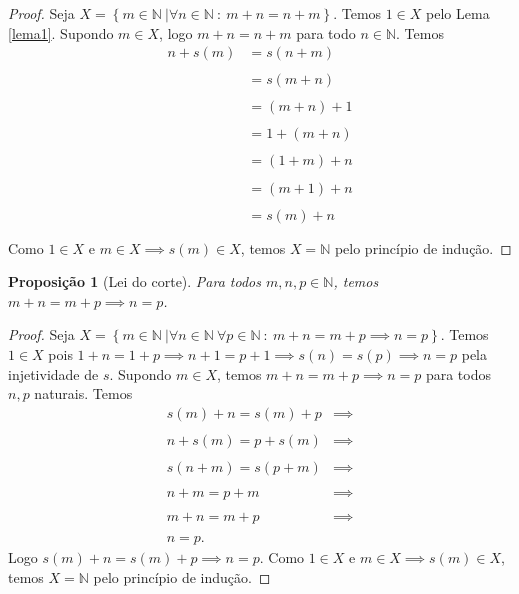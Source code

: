 \documentclass{article}
\theoremstyle{plain}
\newtheorem{prop}{Proposição}[section]
\theoremstyle{definition}
\theoremstyle{remark}
\begin{document}
\begin{proof}
	Seja $X = \left\{ m \in \mathbb{N} \: | \forall n \in \mathbb{N} \: : \:  m+n = n+m \right\}$. Temos $1\in X$  pelo  Lema \ref{lema1}.
	Supondo $m\in X$, logo $m+n = n+m$ para todo $n\in \mathbb{N}$. Temos \begin{align*}
		n + s(m) &= s(n+m)  \\~\\
		&= s(m+n) \\~\\
		&= (m+n) + 1\\~\\
		&= 1+(m +n )\\~\\
		&= (1+m )+n \\~\\
		&= (m+1 )+n \\~\\
		&= s(m) +n \\~\\
	\end{align*}
	Como $1\in X$ e $m \in X \implies s(m) \in X$, temos $X = \mathbb{N}$ pelo princípio de indução.
\end{proof}
\begin{prop}[Lei do corte]
	Para todos $m,n, p  \in \mathbb{N}$, temos $m+n = m +p \implies n = p $.
\end{prop}
\begin{proof}
	Seja $X = \left\{ m \in \mathbb{N} \: | \forall n\in \mathbb{N}\: \forall p \in \mathbb{N} \: : \:  m+n = m+p\implies n=p \right\}$. Temos $1\in X$  pois $1+n = 1+p \implies n+1 = p+1 \implies s(n) = s(p) \implies n =p$ pela injetividade de $s$.
	Supondo $m\in X$, temos $m+n = m+ p \implies n = p$ para todos $n,p$ naturais. Temos \begin{align*}
		s(m) + n = s(m)+p &\implies \\~\\
		n + s(m)  =  p + s(m) &\implies \\~\\
		s(n + m)  =  s(p + m) &\implies \\~\\
		n+m = p+m &\implies \\~\\
		m+ n = m+p &\implies \\~\\
		n = p.
	\end{align*}
	Logo $s(m) +n = s(m) + p \implies n = p$.
	Como $1\in X$ e $m \in X \implies s(m) \in X$, temos $X = \mathbb{N}$ pelo princípio de indução.
\end{proof}
\end{document}
